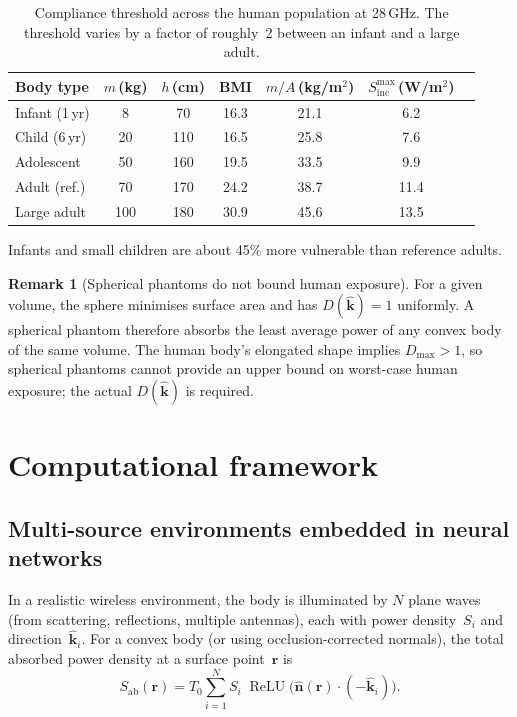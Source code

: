 \documentclass[11pt,a4paper]{article}
\theoremstyle{definition}      %
\newtheorem{remark}[remark]{Remark}
\newcommand{\khat}{\hat{\bm{k}}}
\newcommand{\nhat}{\hat{\bm{n}}}
\newcommand{\rr}{\mathbf{r}}
\newcommand{\Sinc}{S_{\mathrm{inc}}}
\newcommand{\Sab}{S_{\mathrm{ab}}}
\DeclareMathOperator{\ReLU}{ReLU}
\begin{document}
\begin{table}[!htbp]
\centering
\caption{Compliance threshold across the human population at 28\,GHz.
  The threshold varies by a factor of roughly~2 between an infant
  and a large adult.}\label{tab:anthropometric}
\begin{tabular}{lcccccc}
\toprule
Body type & $m$\,(kg) & $h$\,(cm) & BMI & $m/A$\,(kg/m$^2$)
  & $\Sinc^{\max}$\,(W/m$^2$) \\
\midrule
Infant (1\,yr) &  8 &  70 & 16.3 & 21.1 & 6.2  \\
Child (6\,yr)  & 20 & 110 & 16.5 & 25.8 & 7.6  \\
Adolescent     & 50 & 160 & 19.5 & 33.5 & 9.9  \\
Adult (ref.)   & 70 & 170 & 24.2 & 38.7 & 11.4 \\
Large adult    &100 & 180 & 30.9 & 45.6 & 13.5 \\
\bottomrule
\end{tabular}
\end{table}

Infants and small children are about 45\% more vulnerable than
reference adults.

\begin{remark}[Spherical phantoms do not bound human exposure]
For a given volume, the sphere minimises surface area and has
$D(\khat)=1$ uniformly.  A spherical phantom therefore absorbs the
least average power of any convex body of the same volume.  The human
body's elongated shape implies $D_{\max}>1$, so spherical phantoms
cannot provide an upper bound on worst-case human exposure; the actual
$D(\khat)$ is required.
\end{remark}


\section{Computational framework}\label{sec:computation}

\subsection{Multi-source environments embedded in neural networks}\label{sec:neural-net}

In a realistic wireless environment, the body is illuminated by $N$
plane waves (from scattering, reflections, multiple antennas), each
with power density~$S_i$ and direction~$\khat_i$.  For a convex body
(or using occlusion-corrected normals), the total absorbed power
density at a surface point~$\rr$ is
\begin{equation}\label{eq:Sab-multi}
  \Sab(\rr) = T_0\sum_{i=1}^{N}S_i\;\ReLU\!\bigl(\nhat(\rr)\cdot(-\khat_i)\bigr).
\end{equation}
\end{document}
